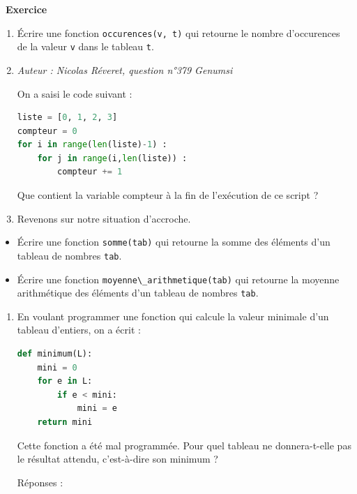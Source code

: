 \documentclass[
  11pt,
]{article}
\newcommand{\passthrough}[1]{#1}
\providecommand{\tightlist}{%
  \setlength{\itemsep}{0pt}\setlength{\parskip}{0pt}}
\newcounter{exo}
\newenvironment{exercice}[1]
{\par \medskip   \addtocounter{exo}{1} \noindent  
\begin{bclogo}[arrondi =0.1,   noborder = true, logo=\bccrayon, marge=4]{~\textbf{Exercice} \textbf{\theexo} {\itshape #1} }  \par}
{
\end{bclogo}
 \par \bigskip }
\newcounter{thme}
\newcounter{def}
\newcounter{prog}
\begin{document}
\begin{exercice}{}

\begin{enumerate}
\def\labelenumi{\arabic{enumi}.}
\item
  Écrire une fonction \passthrough{\lstinline!occurences(v, t)!} qui
  retourne le nombre d'occurences de la valeur
  \passthrough{\lstinline!v!} dans le tableau
  \passthrough{\lstinline!t!}.
\item
  \emph{Auteur : Nicolas Réveret, question n°379 Genumsi}

  On a saisi le code suivant :

\begin{lstlisting}[language=Python]
liste = [0, 1, 2, 3]
compteur = 0
for i in range(len(liste)-1) :
    for j in range(i,len(liste)) :
        compteur += 1
\end{lstlisting}

  Que contient la variable compteur à la fin de l'exécution de ce script
  ?
\item
  Revenons sur notre situation d'accroche.
\end{enumerate}

\begin{itemize}
\tightlist
\item
  Écrire une fonction \passthrough{\lstinline!somme(tab)!} qui retourne
  la somme des éléments d'un tableau de nombres
  \passthrough{\lstinline!tab!}.
\item
  Écrire une fonction
  \passthrough{\lstinline!moyenne\_arithmetique(tab)!} qui retourne la
  moyenne arithmétique des éléments d'un tableau de nombres
  \passthrough{\lstinline!tab!}.
\end{itemize}

\begin{enumerate}
\def\labelenumi{\arabic{enumi}.}
\setcounter{enumi}{3}
\item
  En voulant programmer une fonction qui calcule la valeur minimale d'un
  tableau d'entiers, on a écrit :

\begin{lstlisting}[language=Python]
def minimum(L):
    mini = 0
    for e in L:
        if e < mini:
            mini = e
    return mini
\end{lstlisting}

  Cette fonction a été mal programmée. Pour quel tableau ne
  donnera-t-elle pas le résultat attendu, c'est-à-dire son minimum ?

  Réponses :


\end{enumerate}
\end{exercice}
\end{document}
